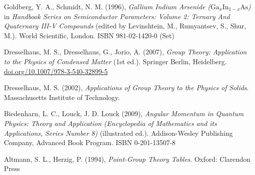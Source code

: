 \documentclass[12pt]{article}
\begin{document}
\begin{thebibliography}{10}
Goldberg, Y. A., Schmidt, N. M. (1996), \textit{Gallium Indium Arsenide ($\text{Ga}_{x}\text{In}_{1-x}\text{As}$)} in \textit{Handbook Series on Semiconductor Parameters: Volume 2: Ternary And Quaternary III-V Compounds} (edited by Levinshtein, M., Rumyantsev, S., Shur, M.). World Scientific, London. ISBN  981-02-1420-0 (Set)

Dresselhaus, M. S., Dresselhaus, G., Jorio, A. (2007), \textit{Group Theory: Application to the Physics of Condensed Matter} (1st ed.). Springer Berlin, Heidelberg. \href{https://doi.org/10.1007/978-3-540-32899-5}{doi.org/10.1007/978-3-540-32899-5}

Dresselhaus, M. S. (2002), \textit{Applications of Group Theory to the Physics of Solids}. Massachusetts Institute of Technology.

Biedenharn, L. C., Louck, J. D. Louck (2009), \textit{Angular Momentum in Quantum Physics: Theory and Application (Encyclopedia of Mathematics and its Applications, Series Number 8)} (illustrated ed.). Addison-Wesley Publishing Company, Advanced Book Program. ISBN 0-201-13507-8

Altmann, S. L., Herzig, P. (1994), \textit{Point-Group Theory Tables}. Oxford: Clarendon Press

\end{thebibliography}



%





\end{document}
